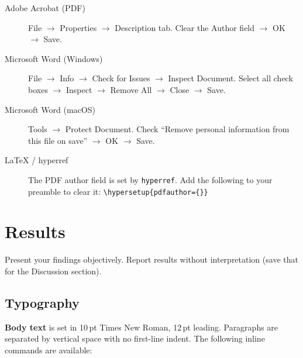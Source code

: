 \documentclass{wpom-upv}
\begin{document}
\begin{description}
  \item[Adobe Acrobat (PDF)] File $\to$ Properties $\to$ Description
    tab. Clear the Author field $\to$ OK $\to$ Save.

  \item[Microsoft Word (Windows)] File $\to$ Info $\to$ Check for
    Issues $\to$ Inspect Document. Select all check boxes $\to$ Inspect
    $\to$ Remove All $\to$ Close $\to$ Save.

  \item[Microsoft Word (macOS)] Tools $\to$ Protect Document. Check
    ``Remove personal information from this file on save'' $\to$ OK
    $\to$ Save.

  \item[\LaTeX{} / hyperref] The PDF author field is set by
    \texttt{hyperref}. Add the following to your preamble to clear it:
    \verb|\hypersetup{pdfauthor={}}|
\end{description}


\section{Results}


Present your findings objectively. Report results without
interpretation (save that for the Discussion section).

\subsection{Typography}

\textbf{Body text} is set in 10\,pt Times New Roman, 12\,pt leading.
Paragraphs are separated by vertical space with no first-line indent.
The following inline commands are available:
\end{document}
